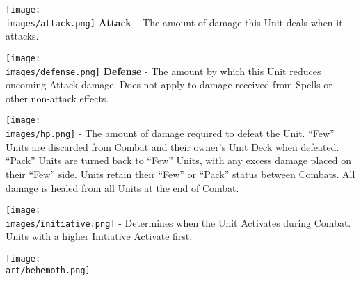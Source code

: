 \begin{multicols}{2}

\vspace{0pt}

\texttt{[image: \\images/attack.png]} \textbf{Attack} – The amount of damage this Unit deals when it attacks.\par
\texttt{[image: \\images/defense.png]} \textbf{Defense} - The amount by which this Unit reduces oncoming Attack damage.
Does not apply to damage received from Spells or other non-attack effects.\par
\texttt{[image: \\images/hp.png]} \textbf{} - The amount of damage required to defeat the Unit.
``Few'' Units are discarded from Combat and their owner's Unit Deck when defeated.
``Pack'' Units are turned back to ``Few'' Units, with any excess damage placed on their ``Few'' side.
Units retain their ``Few'' or ``Pack'' status between Combats.
All damage is healed from all Units at the end of Combat.\par
\texttt{[image: \\images/initiative.png]}{} - Determines when the Unit Activates during Combat.
Units with a higher Initiative Activate first.

\vspace*{\fill}
\hspace{-2em}
{\texttt{[image: \\art/behemoth.png]}}
\vspace*{\fill}
\columnbreak


\end{multicols}
